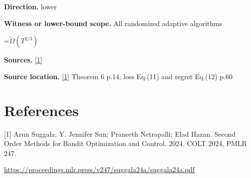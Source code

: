 \documentclass[10pt,a4paper]{article}
\newcommand{\AtlasMath}[1]{\par\begingroup\centering\setbox0=\hbox{$\displaystyle #1$}\ifdim\wd0>1.4\linewidth\typeout{ATLAS WIDE FORMULA: \the\wd0}\fi\ifdim\wd0>\linewidth\resizebox{\linewidth}{!}{\box0}\else\box0\fi\par\endgroup}
\begin{document}
\textbf{Direction.} lower

\textbf{Witness or lower-bound scope.} All randomized adaptive algorithms

\AtlasMath{\widetilde\Omega\!\left(T^{2/3}\right)}
\textbf{Sources.} \href{https://proceedings.mlr.press/v247/suggala24a/suggala24a.pdf}{[1]}

\textbf{Source location.} \href{https://proceedings.mlr.press/v247/suggala24a/suggala24a.pdf}{[1]} Theorem 6 p.14; loss Eq.(11) and regret Eq.(12) p.60

\section{References}
[1] Arun Suggala; Y. Jennifer Sun; Praneeth Netrapalli; Elad Hazan. Second Order Methods for Bandit Optimization and Control. 2024. COLT 2024, PMLR 247.

\url{https://proceedings.mlr.press/v247/suggala24a/suggala24a.pdf}
\end{document}
